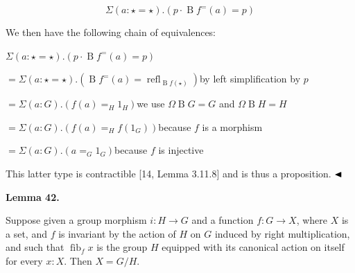 \par  \quad  \[\Sigma(a:\star=\star).(p\cdot\operatorname{B}f^{=}(a)=p)\]\quad  \quad  
  
We then have the following chain of equivalences:\par
  
\par  \quad  $\displaystyle\Sigma(a:\star=\star).$\quad  $\displaystyle(p\cdot\operatorname{B}f^{=}(a)=p)$\quad  \quad  
 
\par  \quad  \quad  $\displaystyle=\Sigma(a:\star=\star).(\operatorname{B}f^{=}(a)=\operatorname{refl}_{\operatorname{B}f(\star)})$\quad  by left simplification by $p$\quad  \quad  
 
\par  \quad  \quad  $\displaystyle=\Sigma(a:G).(f(a)=_{H}1_{H})$\quad  we use $\Omega\operatorname{B}G=G$ and $\Omega\operatorname{B}H=H$\quad  \quad  
 
\par  \quad  \quad  $\displaystyle=\Sigma(a:G).(f(a)=_{H}f(1_{G}))$\quad  because $f$ is a morphism\quad  \quad  
 
\par  \quad  \quad  $\displaystyle=\Sigma(a:G).(a=_{G}1_{G})$\quad  because $f$ is injective\quad  \quad  
  
This latter type is contractible [14, Lemma 3.11.8] and is thus a proposition. $\hfill\blacktriangleleft$\par
 
 
 
\par\medskip\noindent\textbf{Lemma 42.}\par
 
 
Suppose given a group morphism $i:H\to G$ and a function $f:G\to X$, where $X$ is a set, and $f$ is invariant by the action of $H$ on $G$ induced by right multiplication, and such that $\operatorname{fib}_{f}x$ is the group $H$ equipped with its canonical action on itself for every $x:X$. Then $X=G/H$.\par
 
 
 
 
 
